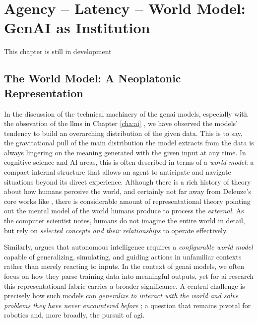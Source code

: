 \chapter{Agency – Latency – World Model: GenAI as Institution}

\begin{orangebox}
	This chapter is still in development
\end{orangebox}


\section{The World Model: A Neoplatonic Representation}
In the discussion of the technical machinery of the \gls{genai} models,
especially with the obsevation of the \glspl{llm} in Chapter \ref{cha:ai}
, we have observed the models' tendency to build an overarching distribution of
the given data. This is to say, the gravitational pull of the main distribution
the model extracts from the data is always lingering on the meaning generated
with the given input at any time. In cognitive science and AI areas, this is often described in terms of a
\emph{world model}: a compact internal structure that allows an agent
to anticipate and navigate situations beyond its direct experience. Although there is a rich history of theory
about how humans perceive the world, and certainly not far away from Deleuze's
core works like , there is considerable amount of
representational theory pointing out the mental model of the world humans
produce to process the \textit{external}. As the computer scientist
\citeauthor{forrester1971} \parencite*{forrester1971}  notes, humans do not imagine the entire
world in detail, but rely on \emph{selected concepts and their
	relationships} to operate effectively.


Similarly, \textcite{lecun2022} argues that autonomous intelligence
requires a \emph{configurable world model} capable of
generalizing, simulating, and guiding actions in unfamiliar contexts
rather than merely reacting to inputs. In the context of
\gls{genai} models, we often focus on how they parse training data
into meaningful outputs, yet for \gls{ai} research this
representational fabric carries a broader significance. A central
challenge is precisely how such models can \emph{generalize to interact
	with the world and solve problems they have never encountered before}
\parencite{lecun2022}; a question that remains pivotal for robotics and,
more broadly, the pursuit of \gls{agi}.


